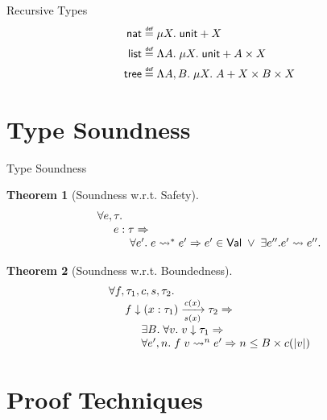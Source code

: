 \documentclass{beamer}
\newtheorem{thm}{Theorem}
\newcommand{\arrow}[4]{#1\xrightarrow[#3]{#2}#4}
\newcommand{\symunit}{\mathsf{unit}}
\newcommand{\symlist}{\mathsf{list}}
\newcommand\defeq{\mathrel{\overset{\makebox[0pt]{\mbox{\normalfont\tiny\sffamily def}}}{=}}}
\begin{document}
\begin{frame}{Recursive Types}
\begin{align*}
\mathsf{nat} &\defeq \mu X.\; \symunit + X \\
\symlist &\defeq \Lambda A.\; \mu X.\; \symunit + A \times X \\
\mathsf{tree} &\defeq \Lambda A,B.\; \mu X.\; A + X \times B \times X
\end{align*}

\end{frame}

\section{Type Soundness}

\begin{frame}{Type Soundness}

\begin{thm}[Soundness w.r.t. Safety]
$$
\begin{array}{l}
\forall e,\tau. \\
\hspace{0.2in}  e:\tau \Rightarrow \\
\hspace{0.4in} \forall e'.\; e \leadsto^* e' \Rightarrow e'\in\mathsf{Val} \;\vee\; \exists e''. e' \leadsto e''.
\end{array}
$$
\end{thm}

\begin{thm}[Soundness w.r.t. Boundedness]
$$
\begin{array}{l}
\forall f,\tau_1,c,s,\tau_2. \\
\hspace{0.2in} f \downarrow \arrow{(x:\tau_1)}{c(x)}{s(x)}{\tau_2} \Rightarrow \\
\hspace{0.4in} \exists B. \;\forall v.\; v \downarrow \tau_1 \Rightarrow \\
\hspace{0.4in} \forall e',n.\; f\;v\leadsto^n e' \Rightarrow n\leq B\times c(|v|)
\end{array}
$$
\end{thm}

\end{frame}

\section{Proof Techniques}
\end{document}
